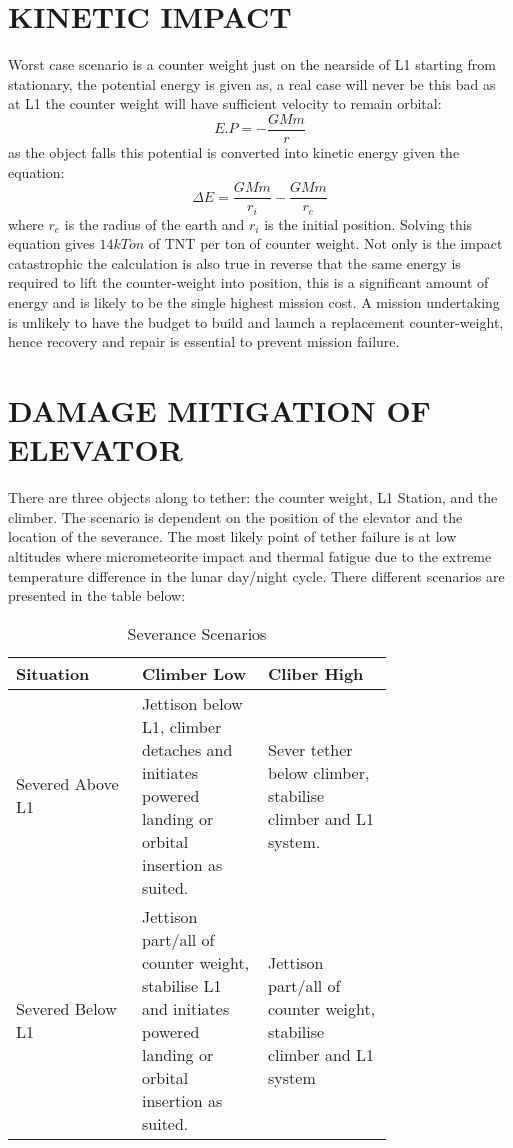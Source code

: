 \documentclass[twocolumn,prl,nobalancelastpage,aps,10pt]{revtex4-1}
\begin{document}
\section{KINETIC IMPACT}

Worst case scenario is a counter weight just on the nearside of L1 starting from stationary, the potential energy is given as, a real case will never be this bad as at L1 the counter weight will have sufficient velocity to remain orbital:
\begin{equation}
E.P = - \frac{GMm}{r}
\end{equation}
as the object falls this potential is converted into kinetic energy given the equation:
\begin{equation}
\Delta E = \frac{GMm}{r_i} - \frac{GMm}{r_e}
\end{equation}
where $r_e$ is the radius of the earth and $r_i$ is the initial position. Solving this equation gives $14 kTon$ of TNT per ton of counter weight. Not only is the impact catastrophic the calculation is also true in reverse that the same energy is required to lift the counter-weight into position, this is a significant amount of energy and is likely to be the single highest mission cost. A mission undertaking is unlikely to have the budget to build and launch a replacement counter-weight, hence recovery and repair is essential to prevent mission failure.

\section{DAMAGE MITIGATION OF ELEVATOR}

There are three objects along to tether: the counter weight, L1 Station, and the climber. The scenario is dependent on the position of the elevator and the location of the severance. The most likely point of tether failure is at low altitudes where micrometeorite impact and thermal fatigue due to the extreme temperature difference in the lunar day/night cycle. There different scenarios are presented in the table below:

\begin{table}[h!]
  \begin{center}
    \caption{Severance Scenarios}
    \label{tab:scenarios}
    \begin{tabular}{|p{0.25\linewidth}|p{0.25\linewidth}|p{0.25\linewidth}}
      \hline
      Situation & Climber Low & Cliber High\\
      \hline
      Severed Above L1 & Jettison below L1, climber detaches and initiates powered landing or orbital insertion as suited. & Sever tether below climber, stabilise climber and L1 system.\\
      \hline
      Severed Below L1 & Jettison part/all of counter weight, stabilise L1 and initiates powered landing or orbital insertion as suited. & Jettison part/all of counter weight, stabilise climber and L1 system \\
      \hline
    \end{tabular}
  \end{center}
\end{table}
\end{document}
